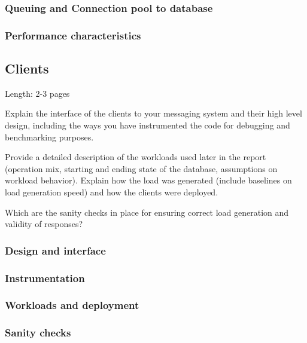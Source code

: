 \documentclass[11pt]{article}
\begin{document}
\subsubsection{Queuing and Connection pool to database}\label{sec:queuing-and-connection-pool-to-database}

\subsubsection{Performance characteristics}\label{sec:performance-characteristics-1}

\subsection{Clients}\label{sec:clients}

Length: 2-3 pages

Explain the interface of the clients to your messaging system and their
high level design, including the ways you have instrumented the code for
debugging and benchmarking purposes.

Provide a detailed description of the workloads used later in the report
(operation mix, starting and ending state of the database, assumptions
on workload behavior). Explain how the load was generated (include
baselines on load generation speed) and how the clients were deployed.

Which are the sanity checks in place for ensuring correct load
generation and validity of responses?

\subsubsection{Design and interface}\label{sec:design-and-interface}

\subsubsection{Instrumentation}\label{sec:instrumentation}

\subsubsection{Workloads and deployment}\label{sec:workloads-and-deployment}

\subsubsection{Sanity checks}\label{sec:sanity-checks}
\end{document}
